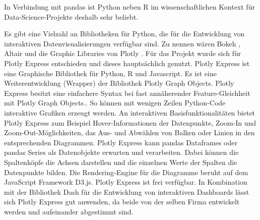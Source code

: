     In Verbindung mit pandas ist Python neben \textsf{R} im wissenschaftlichen Kontext für Data-Science-Projekte deshalb sehr beliebt.
    
    Es gibt eine Vielzahl an Bibliotheken für Python, die für die Entwicklung von interaktiven Datenvisualisierungen verfügbar sind. Zu
    nennen wären Bokeh \cite[vgl.][]{van_de_ven_bokeh_2021}, Altair \cite[vgl.][]{altair_altair_2021} und die 
    Graphic Libraries von Plotly \cite[vgl.][]{plotly_plotly_2021}. Für das Projekt wurde sich für Plotly Express entschieden 
    und dieses hauptsächlich genutzt. 
    Plotly Express ist eine Graphische Bibliothek für Python, \textsf{R} und Javascript. Es ist eine Weiterentwicklung (Wrapper) der Bibliothek Plotly Graph Objects. 
    Plotly Express besitzt eine einfachere Syntax bei fast annäherender Feature-Gleichheit mit Plotly Graph Objects.\cite[][]{plotly_plotly_2021}.
    So können mit wenigen Zeilen Python-Code interaktive Grafiken erzeugt werden. 
    An interaktiven Basisfunktionalitäten bietet Plotly Express zum Beispiel Hover-Informationen der Datenpunkte, Zoom-In und Zoom-Out-Möglichkeiten,
    das Aus- und Abwählen von Balken oder Linien in den entsprechenden Diagrammen. Plotly Express kann pandas Dataframes 
    oder pandas Series als Datenobjekte erwarten und verarbeiten. Dabei können die Spaltenköpfe die Achsen darstellen 
    und die einzelnen Werte der Spalten die Datenpunkte bilden. Die Rendering-Engine für die Diagramme beruht auf dem JavaScript Framework D3.js. 
    Plotly Express ist frei verfügbar. In Kombination mit der Bibliothek Dash für die Entwicklung von interaktiven Dashboards lässt sich Plotly Express gut anwenden, 
    da beide von der selben Firma entwickelt werden und aufeinander abgestimmt sind. 
    
